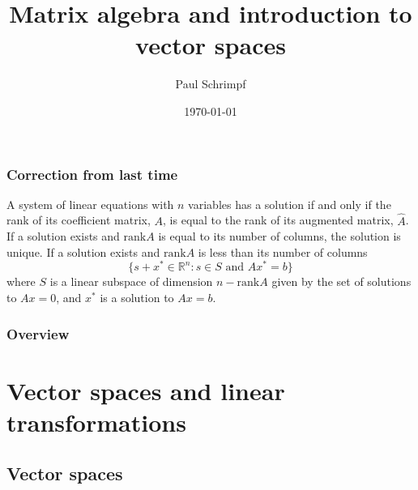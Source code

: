 \documentclass[compress]{beamer}
\title{Matrix algebra and introduction to vector spaces}
\author{Paul Schrimpf}
\institute{UBC \\ Economics 526}
\date{\today}
\newcommand{\rank}{\mathrm{rank}}
\theoremstyle{definition}
\begin{document}
\frame{\titlepage}

\begin{frame}
  \frametitle{Correction from last time}  
  \begin{theorem} \label{thm:rc} A system of
    linear equations with $n$ variables has a solution if and only
    if the rank of its coefficient matrix, $A$, is equal to the rank
    of its augmented matrix, $\hat{A}$. If a solution exists and
    $\rank A$ is equal to its number of columns, the solution is
    unique. If a solution exists and $\rank A$ is less than its
    number of columns 
    \[ 
    \{s+x^* \in \mathbb{R}^n : s \in S \text{ and } Ax^* = b \} 
    \]
    where $S$ is a linear subspace of dimension $n - \rank A$ given by
    the set of solutions to $A x =0$, and $x^*$ is a solution to $A x
    = b$.
  \end{theorem}
\end{frame}

\begin{frame}
  \frametitle{Overview}
  
  \tableofcontents
\end{frame}

\section{Vector spaces and linear transformations}

\subsection{Vector spaces}
\end{document}
